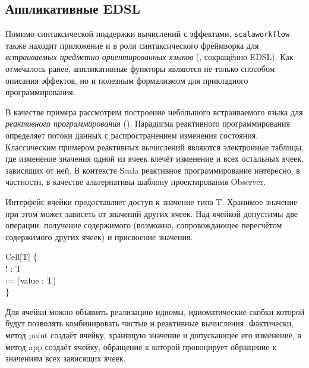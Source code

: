 \subsection{Аппликативные EDSL}
Помимо синтаксической поддержки вычислений с эффектами, \texttt{scala\-workflow} также находит приложение и в роли синтаксического фреймворка для \emph{встраиваемых предметно-ориентированных языков} (, сокращённо EDSL). Как отмечалось ранее, аппликативные функторы являются не только способом описания эффектов, но и полезным формализмом для прикладного программирования.

В качестве примера рассмотрим построение небольшого встраиваемого языка для \emph{реактивного программирования}\cite{Elliott2009} (). Парадигма реактивного программирования определяет потоки данных с распространением изменения состояния. Классическим примером реактивных вычислений являются электронные таблицы, где изменение значения одной из ячеек влечёт изменение и всех остальных ячеек, зависящих от ней. В контексте Scala реактивное программирование интересно, в частности, в качестве альтернативы шаблону проектирования Observer\cite{Maier2010}.

Интерфейс ячейки предоставляет доступ к значение типа \<T\>. Хранимое значение при этом может зависеть от значений других ячеек. Над ячейкой допустимы две операции: получение содержимого (возможно, сопровождающее пересчётом содержимого других ячеек) и присвоение значения. 

\begin{haskell}
 Cell[T] \{\\
\quad{} ! : T\\
\quad{} := (value : T)\\
\}
\end{haskell}

Для ячейки можно объявить реализацию идиомы, идиоматические скобки которой будут позволять комбинировать чистые и реактивные вычисления. Фактически, метод \<point\> создаёт ячейку, хранящую значение и допускающее его изменение, а метод \<app\> создаёт ячейку, обращение к которой провоцирует обращение к значениям всех зависящих ячеек.


